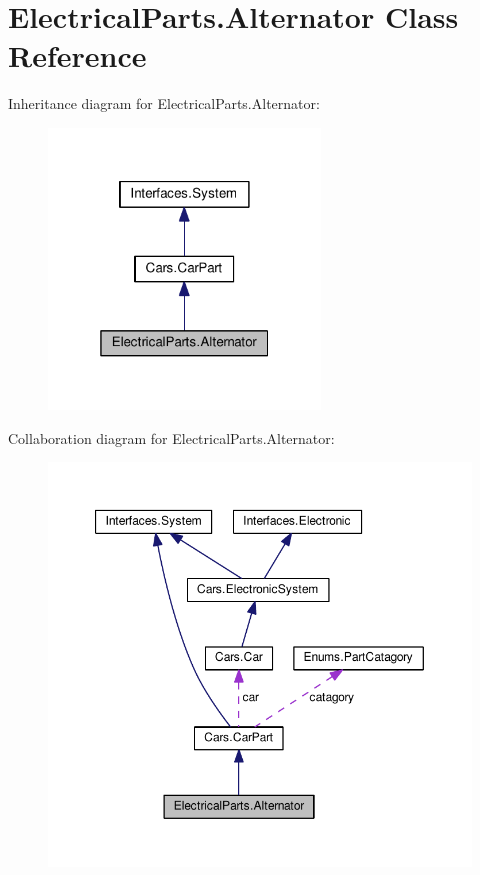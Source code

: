 \hypertarget{classElectricalParts_1_1Alternator}{}\section{Electrical\+Parts.\+Alternator Class Reference}
\label{classElectricalParts_1_1Alternator}


Inheritance diagram for Electrical\+Parts.\+Alternator\+:\nopagebreak
\begin{figure}[H]
\begin{center}
\leavevmode
\includegraphics[width=205pt]{classElectricalParts_1_1Alternator__inherit__graph}
\end{center}
\end{figure}


Collaboration diagram for Electrical\+Parts.\+Alternator\+:\nopagebreak
\begin{figure}[H]
\begin{center}
\leavevmode
\includegraphics[width=350pt]{classElectricalParts_1_1Alternator__coll__graph}
\end{center}
\end{figure}
